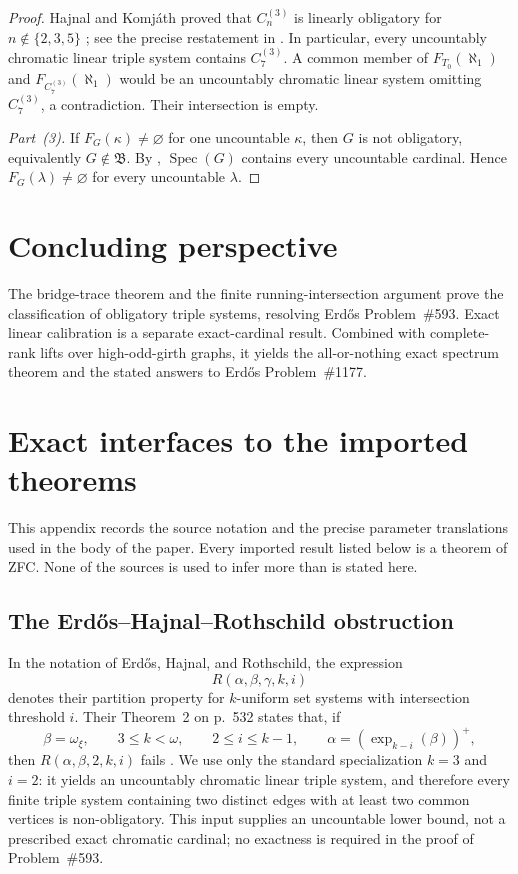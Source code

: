 \documentclass[11pt]{amsart}
\theoremstyle{definition}
\theoremstyle{remark}
\numberwithin{equation}{section}
\DeclareMathOperator{\Spec}{Spec}
\newcommand{\Bclass}{\mathfrak B}
\begin{document}
\begin{proof}
Hajnal and Komj\'ath proved that $C_n^{(3)}$ is linearly obligatory for
$n\notin\{2,3,5\}$ \cite{HK2008}; see the precise restatement in
\cite[\S3.7, p.~43]{ReiherGirth}.  In particular, every uncountably
chromatic linear triple system contains $C_7^{(3)}$.  A common member of
$F_{T_0}(\aleph_1)$ and $F_{C_7^{(3)}}(\aleph_1)$ would be an
uncountably chromatic linear system omitting $C_7^{(3)}$, a
contradiction.  Their intersection is empty.

\emph{Part~\textup{(3)}.}
If $F_G(\kappa)\ne\varnothing$ for one uncountable $\kappa$, then $G$
is not obligatory, equivalently $G\notin\Bclass$.  By
, $\Spec(G)$ contains every uncountable cardinal.
Hence $F_G(\lambda)\ne\varnothing$ for every uncountable $\lambda$.
\end{proof}

\section{Concluding perspective}

The bridge-trace theorem and the finite running-intersection argument
prove the classification of obligatory triple systems, resolving
Erd\H{o}s Problem~\#593.  Exact linear calibration is a separate
exact-cardinal result.  Combined with complete-rank lifts over
high-odd-girth graphs, it yields the all-or-nothing exact spectrum
theorem and the stated answers to Erd\H{o}s Problem~\#1177.


\appendix

\section{Exact interfaces to the imported theorems}
\label{app:external-interface}

This appendix records the source notation and the precise parameter
translations used in the body of the paper.  Every imported result listed
below is a theorem of ZFC.  None of the sources is used to infer more than
is stated here.

\subsection{The Erd\H{o}s--Hajnal--Rothschild obstruction}

In the notation of Erd\H{o}s, Hajnal, and Rothschild, the expression
\[
 R(\alpha,\beta,\gamma,k,i)
\]
denotes their partition property for $k$-uniform set systems with
intersection threshold $i$.  Their Theorem~2 on p.~532 states that, if
\[
 \beta=\omega_\xi,\qquad 3\le k<\omega,\qquad 2\le i\le k-1,
 \qquad
 \alpha=(\exp_{k-i}(\beta))^+,
\]
then $R(\alpha,\beta,2,k,i)$ fails
\cite[Theorem~2, p.~532]{EHR1973}.  We use only the standard specialization
$k=3$ and $i=2$: it yields an uncountably chromatic linear triple system,
and therefore every finite triple system containing two distinct edges
with at least two common vertices is non-obligatory.  This input supplies
an uncountable lower bound, not a prescribed exact chromatic cardinal; no
exactness is required in the proof of Problem~\#593.
\end{document}
